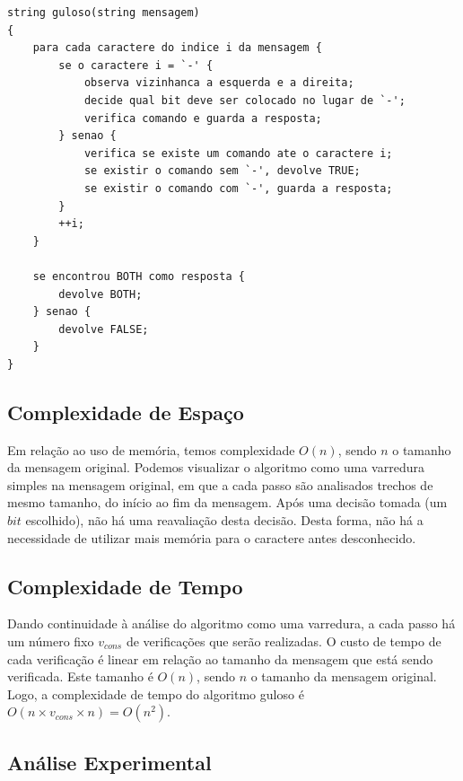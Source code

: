 \documentclass[a4paper,12pt,titlepage]{article}
\begin{document}
\begin{lstlisting}[caption=Algoritmo Guloso]
string guloso(string mensagem)
{
    para cada caractere do indice i da mensagem {
        se o caractere i = `-' {
            observa vizinhanca a esquerda e a direita;
            decide qual bit deve ser colocado no lugar de `-';
            verifica comando e guarda a resposta;
        } senao {
            verifica se existe um comando ate o caractere i;
            se existir o comando sem `-', devolve TRUE;
            se existir o comando com `-', guarda a resposta;
        }
        ++i;
    }
    
    se encontrou BOTH como resposta {
        devolve BOTH;
    } senao {
        devolve FALSE;
    }
}
\end{lstlisting}

\subsection{Complexidade de Espaço}

Em relação ao uso de memória, temos complexidade $O(n)$, sendo $n$ o tamanho da mensagem original. Podemos visualizar o algoritmo como uma varredura simples na mensagem original, em que a cada passo são analisados trechos de mesmo tamanho, do início ao fim da mensagem. Após uma decisão tomada (um $bit$ escolhido), não há uma reavaliação desta decisão. Desta forma, não há a necessidade de utilizar mais memória para o caractere antes desconhecido.

\subsection{Complexidade de Tempo}

Dando continuidade à análise do algoritmo como uma varredura, a cada passo há um número fixo $v_{cons}$ de verificações que serão realizadas. O custo de tempo de cada verificação é linear em relação ao tamanho da mensagem que está sendo verificada. Este tamanho é $O(n)$, sendo $n$ o tamanho da mensagem original. Logo, a complexidade de tempo do algoritmo guloso é $O(n \times v_{cons} \times n) = O(n^2)$.

\subsection{Análise Experimental}
\end{document}
